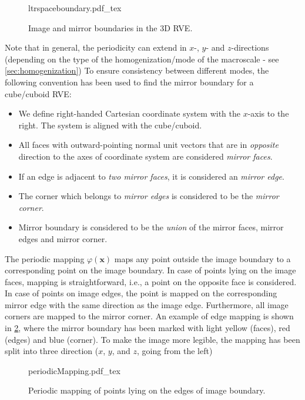 \documentclass[11pt]{article}
\begin{document}
\begin{figure}
    \centering
    \def\svgwidth{0.6\textwidth}
    {ltrspaceboundary.pdf_tex}
    \caption{Image and mirror boundaries in the 3D RVE.}
    \label{fig:ltrspaceboundary}
\end{figure}

Note that in general, the periodicity can extend in $x$-, $y$- and $z$-directions (depending on the type of the homogenization/mode of the macroscale - see \cref{sec:homogenization})
To ensure consistency between different modes, the following convention has been used to find the mirror boundary for a cube/cuboid RVE:
\begin{itemize}
    \item We define right-handed Cartesian coordinate system with the $x$-axis to the right. The system is aligned with the cube/cuboid.
    \item All faces with outward-pointing normal unit vectors that are in \textit{opposite} direction to the axes of coordinate system are considered \textit{mirror faces}.
    \item If an edge is adjacent to \textit{two mirror faces}, it is considered an \textit{mirror edge}.
    \item The corner which belongs to \textit{mirror edges} is considered to be the \textit{mirror corner}.
    \item Mirror boundary is considered to be the \textit{union} of the mirror faces, mirror edges and mirror corner.
\end{itemize}

The periodic mapping $\varphi(\bm{x})$ maps any point outside the image boundary to a corresponding point on the image boundary. In case of points lying on the image faces, mapping is straightforward, i.e., a point on the opposite face is considered. In case of points on image edges, the point is mapped on the corresponding mirror edge with the same direction as the image edge. 
Furthermore, all image corners are mapped to the mirror corner. 
An example of edge mapping is shown in \cref{fig:periodicity}, where the mirror boundary has been marked with light yellow (faces), red (edges) and blue (corner). To make the image more legible, the mapping has been split into three direction ($x$, $y$, and $z$, going from the left)

\begin{figure}
    \centering
    \def\svgwidth{0.8\textwidth}
    {periodicMapping.pdf_tex}
    \caption{Periodic mapping of points lying on the edges of image boundary.}
    \label{fig:periodicity}
\end{figure}
\end{document}
